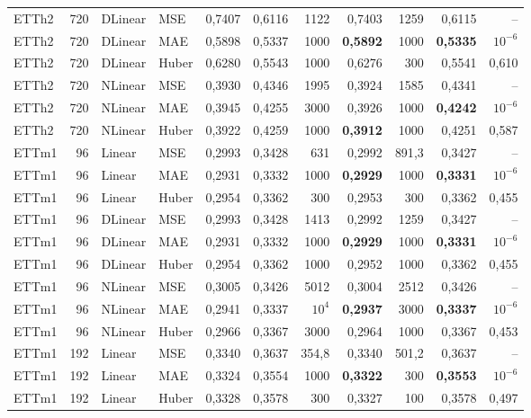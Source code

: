 {\begin{longtable}{@{}lrll rr rr rr r@{}}
\addlinespace[2pt]
ETTh2 & 720 & DLinear & MSE & 0{,}7407 & 0{,}6116 & 1122 & 0{,}7403 & 1259 & 0{,}6115 & -- \\
ETTh2 & 720 & DLinear & MAE & 0{,}5898 & 0{,}5337 & 1000 & \textbf{0{,}5892} & 1000 & \textbf{0{,}5335} & $10^{-6}$ \\
ETTh2 & 720 & DLinear & Huber & 0{,}6280 & 0{,}5543 & 1000 & 0{,}6276 & 300 & 0{,}5541 & 0{,}610 \\
\addlinespace[2pt]
ETTh2 & 720 & NLinear & MSE & 0{,}3930 & 0{,}4346 & 1995 & 0{,}3924 & 1585 & 0{,}4341 & -- \\
ETTh2 & 720 & NLinear & MAE & 0{,}3945 & 0{,}4255 & 3000 & 0{,}3926 & 1000 & \textbf{0{,}4242} & $10^{-6}$ \\
ETTh2 & 720 & NLinear & Huber & 0{,}3922 & 0{,}4259 & 1000 & \textbf{0{,}3912} & 1000 & 0{,}4251 & 0{,}587 \\
\addlinespace[2pt]
ETTm1 & 96 & Linear & MSE & 0{,}2993 & 0{,}3428 & 631 & 0{,}2992 & 891{,}3 & 0{,}3427 & -- \\
ETTm1 & 96 & Linear & MAE & 0{,}2931 & 0{,}3332 & 1000 & \textbf{0{,}2929} & 1000 & \textbf{0{,}3331} & $10^{-6}$ \\
ETTm1 & 96 & Linear & Huber & 0{,}2954 & 0{,}3362 & 300 & 0{,}2953 & 300 & 0{,}3362 & 0{,}455 \\
\addlinespace[2pt]
ETTm1 & 96 & DLinear & MSE & 0{,}2993 & 0{,}3428 & 1413 & 0{,}2992 & 1259 & 0{,}3427 & -- \\
ETTm1 & 96 & DLinear & MAE & 0{,}2931 & 0{,}3332 & 1000 & \textbf{0{,}2929} & 1000 & \textbf{0{,}3331} & $10^{-6}$ \\
ETTm1 & 96 & DLinear & Huber & 0{,}2954 & 0{,}3362 & 1000 & 0{,}2952 & 1000 & 0{,}3362 & 0{,}455 \\
\addlinespace[2pt]
ETTm1 & 96 & NLinear & MSE & 0{,}3005 & 0{,}3426 & 5012 & 0{,}3004 & 2512 & 0{,}3426 & -- \\
ETTm1 & 96 & NLinear & MAE & 0{,}2941 & 0{,}3337 & $10^{4}$ & \textbf{0{,}2937} & 3000 & \textbf{0{,}3337} & $10^{-6}$ \\
ETTm1 & 96 & NLinear & Huber & 0{,}2966 & 0{,}3367 & 3000 & 0{,}2964 & 1000 & 0{,}3367 & 0{,}453 \\
\addlinespace[2pt]
ETTm1 & 192 & Linear & MSE & 0{,}3340 & 0{,}3637 & 354{,}8 & 0{,}3340 & 501{,}2 & 0{,}3637 & -- \\
ETTm1 & 192 & Linear & MAE & 0{,}3324 & 0{,}3554 & 1000 & \textbf{0{,}3322} & 300 & \textbf{0{,}3553} & $10^{-6}$ \\
ETTm1 & 192 & Linear & Huber & 0{,}3328 & 0{,}3578 & 300 & 0{,}3327 & 100 & 0{,}3578 & 0{,}497 \\

\end{longtable}}
